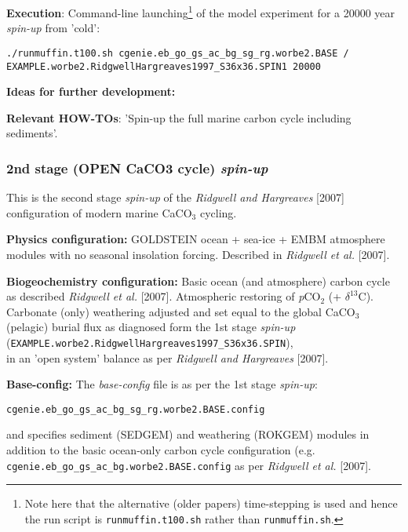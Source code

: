 \documentclass[10pt,twoside]{article}
\begin{document}
\noindent \textbf{Execution}: Command-line launching\footnote{Note here that the alternative (older papers) time-stepping is used and hence the run script is \texttt{runmuffin.t100.sh} rather than \texttt{runmuffin.sh}.} of the model experiment for a 20000 year \textit{spin-up} from 'cold':
\vspace{-10pt}\small\begin{verbatim}./runmuffin.t100.sh cgenie.eb_go_gs_ac_bg_sg_rg.worbe2.BASE / 
EXAMPLE.worbe2.RidgwellHargreaves1997_S36x36.SPIN1 20000 \end{verbatim}\normalsize\vspace{-10pt}

\noindent \textbf{Ideas for further development:} 

\noindent \textbf{Relevant HOW-TOs}: 'Spin-up the full marine carbon cycle including sediments'.


\subsubsection{2nd stage (OPEN CaCO3 cycle) \textit{spin-up}}\label{EXAMPLE.worbe2.RidgwellHargreaves1997_S36x36.SPIN2}

This is the second stage \textsl{spin-up} of the \textit{Ridgwell and Hargreaves} [2007] configuration of modern marine CaCO$_{3}$ cycling.

\noindent \textbf{Physics configuration:} GOLDSTEIN ocean + sea-ice + EMBM atmosphere modules with no seasonal insolation forcing. Described in \textit{Ridgwell et al.} [2007].

\noindent \textbf{Biogeochemistry configuration:} Basic ocean (and atmosphere) carbon cycle as described \textit{Ridgwell et al.} [2007]. Atmospheric restoring of \textit{p}CO$_{2}$ (+ $\delta^{13}$C). Carbonate (only) weathering adjusted and set equal to the global CaCO$_{3}$ (pelagic) burial flux as diagnosed form the 1st stage \textit{spin-up} 
\\ (\texttt{EXAMPLE.worbe2.RidgwellHargreaves1997\_S36x36.SPIN}),
\\ in an 'open system' balance as per \textit{Ridgwell and Hargreaves} [2007].

\noindent \textbf{Base-config:} The \textit{base-config} file is as per the 1st stage \textit{spin-up}:
\vspace{-10pt}\begin{verbatim}cgenie.eb_go_gs_ac_bg_sg_rg.worbe2.BASE.config\end{verbatim}\vspace{-10pt}
and specifies sediment (SEDGEM) and weathering (ROKGEM) modules in addition to the basic ocean-only carbon cycle configuration (e.g. \texttt{cgenie.eb\_go\_gs\_ac\_bg.worbe2.BASE.config} as per \textit{Ridgwell et al.} [2007].
\end{document}

